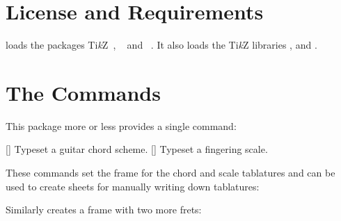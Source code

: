 \documentclass[load-preamble+]{cnltx-doc}
\newcommand*\TikZ{Ti\textit{k}Z}
\begin{document}
\section{License and Requirements}

\license

\guitarchordschemes{} loads the packages \TikZ~\cite{pkg:pgf},
~\cite{pkg:etoolbox} and ~\cite{pkg:pgfopts}.  It
also loads the \TikZ{} libraries ,  and
.


\section{The Commands}
This package more or less provides a single command:
\begin{commands}
  []
    Typeset a guitar chord scheme.
  []
    Typeset a fingering scale.
\end{commands}
These commands set the frame for the chord and scale tablatures and can be used
to create sheets for manually writing down tablatures:
\begin{example}
  \chordscheme
\end{example}

Similarly  creates a frame with two more frets:
\begin{example}
  \scales
\end{example}
\end{document}
